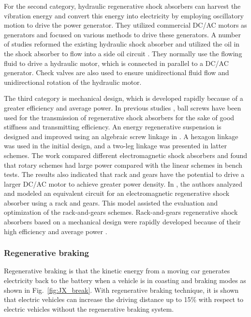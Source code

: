 For the second category, hydraulic regenerative shock absorbers can harvest the vibration energy and convert this energy into electricity by employing oscillatory motion to drive the power generator.
They utilized commercial DC/AC motors as generators and focused on various methods to drive these generators.
A number of studies reformed the existing hydraulic shock absorber and utilized the oil in the shock absorber to flow into a side oil circuit \cite{JX_doi,JX_ZHANG2015485}.
They normally use the flowing fluid to drive a hydraulic motor, which is connected in parallel to a DC/AC generator.
Check valves are also used to ensure unidirectional fluid flow and unidirectional rotation of the hydraulic motor.

The third category is mechanical design, which is developed rapidly because of a greater efficiency and average power.
In previous studies \cite{JX_6063995,JX_pub1643510,JX_6587850,JX_7057652}, ball screws have been used for the transmission of regenerative shock absorbers for the sake of good stiffness and transmitting efficiency.
An energy regenerative suspension is designed and improved using an algebraic screw linkage in \cite{JX_6587850,JX_7057652}.
A hexagon linkage was used in the initial design, and a two-leg linkage was presented in latter schemes.
The work \cite{JX_Gupta2006} compared different electromagnetic shock absorbers and found that rotary schemes had large power compared with the linear schemes in bench tests.
The results also indicated that rack and gears have the potential to drive a larger DC/AC motor to achieve greater power density.
In \cite{JX_5545646}, the authors analyzed and modeled an equivalent circuit for an electromagnetic regenerative shock absorber using a rack and gears.
This model assisted the evaluation and optimization of the rack-and-gears schemes. Rack-and-gears regenerative shock absorbers based on a mechanical design were rapidly developed because of their high efficiency and average power \cite{JX_6399623,JX_0964}.

\subsubsection{Regenerative braking}

Regenerative braking is that the kinetic energy from a moving car generates electricity back to the battery when a vehicle is in coasting and braking modes as shown in Fig.~\ref{fig:JX_break}.
With regenerative braking technique, it is shown that electric vehicles can increase the driving distance up to 15\% with respect to electric vehicles without the regenerative braking system.

